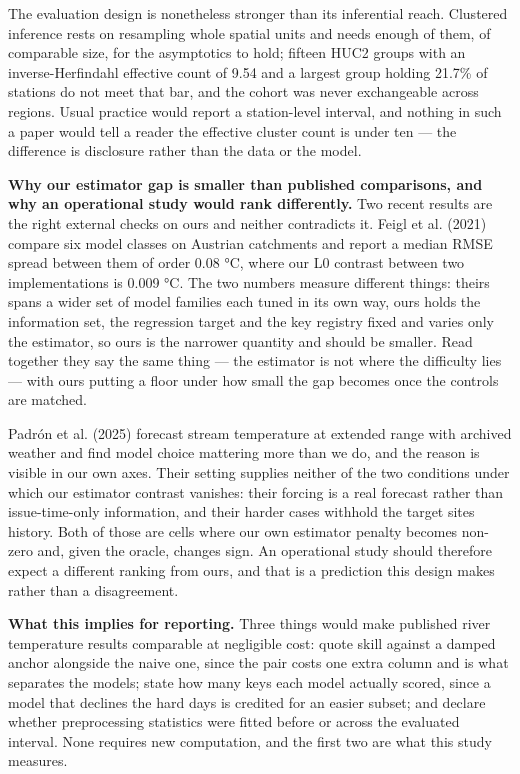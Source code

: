 The evaluation design is nonetheless stronger than its inferential reach.
Clustered inference rests on resampling whole spatial units and needs enough of
them, of comparable size, for the asymptotics to hold; fifteen HUC2 groups with
an inverse-Herfindahl effective count of 9.54 and a largest group holding 21.7\%
of stations do not meet that bar, and the cohort was never exchangeable across
regions. Usual practice would report a station-level interval, and nothing in
such a paper would tell a reader the effective cluster count is under ten --- the
difference is disclosure rather than the data or the model.

\textbf{Why our estimator gap is smaller than published comparisons, and why an
operational study would rank differently.} Two recent results are the right
external checks on ours and neither contradicts it. Feigl et al. (2021) compare
six model classes on Austrian catchments and report a median RMSE spread between
them of order 0.08 °C, where our L0 contrast between two implementations is
0.009 °C. The two numbers measure different things: theirs spans a wider set of
model families each tuned in its own way, ours holds the information set, the
regression target and the key registry fixed and varies only the estimator, so
ours is the narrower quantity and should be smaller. Read together they say the
same thing --- the estimator is not where the difficulty lies --- with ours putting a
floor under how small the gap becomes once the controls are matched.

Padrón et al. (2025) forecast stream temperature at extended range with archived
weather and find model choice mattering more than we do, and the reason is
visible in our own axes. Their setting supplies neither of the two conditions
under which our estimator contrast vanishes: their forcing is a real forecast
rather than issue-time-only information, and their harder cases withhold the
target site\textquotesingle s history. Both of those are cells where our own estimator penalty
becomes non-zero and, given the oracle, changes sign. An operational study
should therefore expect a different ranking from ours, and that is a prediction
this design makes rather than a disagreement.

\textbf{What this implies for reporting.} Three things would make published river
temperature results comparable at negligible cost: quote skill against a damped
anchor alongside the naive one, since the pair costs one extra column and is
what separates the models; state how many keys each model actually scored, since
a model that declines the hard days is credited for an easier subset; and
declare whether preprocessing statistics were fitted before or across the
evaluated interval. None requires new computation, and the first two are what
this study measures.

